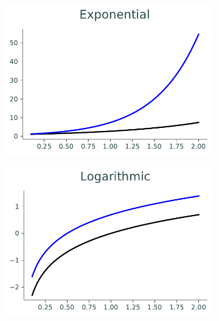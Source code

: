 \begin{figure}[H] %
\captionsetup[subfigure]{justification=centering}
\centering
\begin{framed}
\begin{subfigure}{.49\textwidth}
    \centering
    \includegraphics[width=\linewidth]{figures/subplots_1.pdf}
\end{subfigure}
%
\begin{subfigure}{.49\textwidth}
    \centering
    \includegraphics[width=\linewidth]{figures/subplots_2.pdf}
\end{subfigure}
\end{framed}
\end{figure}

